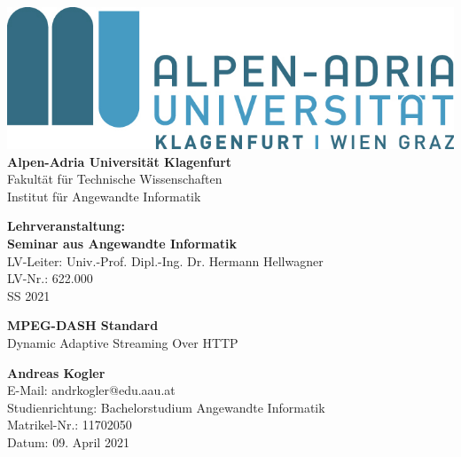 \documentclass[paper = a4, fontsize = 12pt, parskip = half]{scrartcl} %
\begin{document}

\begin{titlepage}

    \begin{center}
        \includegraphics{images/logo.jpg} \\
        \vspace{8mm}
        \huge\textbf{Alpen-Adria Universität Klagenfurt} \\
        \vspace{3mm}
        Fakultät für Technische Wissenschaften \\
        \vspace{3mm}
        Institut für Angewandte Informatik \\
        \vspace{3mm}
    \end{center}
    
    \vspace{5mm}
    
    \begin{center}
        \textbf{Lehrveranstaltung: \\
            Seminar aus Angewandte Informatik} \\
        \vspace{2mm}
        LV-Leiter: Univ.-Prof. Dipl.-Ing. Dr. Hermann Hellwagner \\
        LV-Nr.: 622.000 \\
        SS 2021
    \end{center}
    
    \vspace{15mm}
    
    \begin{center}
        \Large\textbf{MPEG-DASH Standard} \\
        \vspace{2mm}
        \normalsize Dynamic Adaptive Streaming Over HTTP
    \end{center}
    
    \vspace{40mm}
    
    \begin{flushleft}
        \textbf{Andreas Kogler} \\
        E-Mail: andrkogler@edu.aau.at \\
        Studienrichtung: Bachelorstudium Angewandte Informatik \\
        Matrikel-Nr.: 11702050\\
        Datum: 09. April 2021
    \end{flushleft}
    
\end{titlepage}
\end{document}
